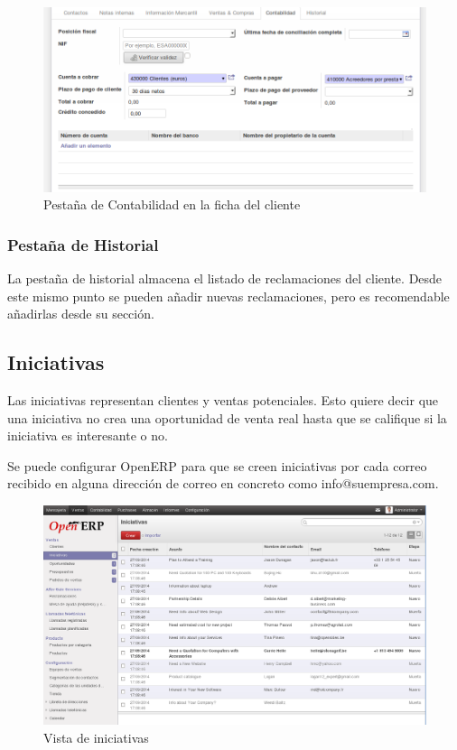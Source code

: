 \begin{figure}[H]
\includegraphics[width=\textwidth]{ventas/img/ven_clicontablidad.png}
\caption{Pestaña de Contabilidad en la ficha del cliente}
\label{ven:clicontabilidad}
\end{figure}



\subsubsection{Pestaña de Historial} 
La pestaña de historial almacena el listado de reclamaciones del cliente. Desde este
mismo punto se pueden añadir nuevas reclamaciones, pero es recomendable añadirlas desde su
sección.


\subsection{Iniciativas}
\label{iniciativas}
Las iniciativas representan clientes y ventas potenciales. Esto quiere decir que una iniciativa no crea una oportunidad de venta real
hasta que se califique si la iniciativa es interesante o no.

Se puede configurar OpenERP para que se creen iniciativas por cada correo recibido en alguna dirección de correo en concreto como info@suempresa.com.


\begin{figure}[H]
\includegraphics[width=\textwidth]{ventas/img/ven_iniciativas.png}
\caption{Vista de iniciativas}
\label{ven:iniciativas}
\end{figure}

